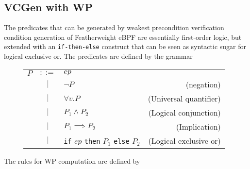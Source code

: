 \subsection{VCGen with WP}
\label{subsec:vcgen_wp}

The predicates that can be generated by weakest precondition verification condition generation of Featherweight eBPF are essentially first-order logic, but extended with an \texttt{if-then-else} construct that can be seen as syntactic sugar for logical exclusive or. The predicates are defined by the grammar
\begin{figure}[H]
  \centering
  \begin{tabular}{lclr}
    $P$ & $::=$ & $ep$ & \\
                 & $|$ & $\neg P$ & (negation) \\    
                 & $|$ & $\forall v . P$ & (Universal quantifier) \\
                 & $|$ &  $P_1 \land P_2$ & (Logical conjunction) \\
                 & $|$ &  $P_1 \implies P_2$ & (Implication) \\
                 & $|$ &  \texttt{if} $ep$ \texttt{then} $P_1$ \texttt{else}  $P_2$ & (Logical exclusive or) \\        
\end{tabular}    
\end{figure}



The rules for WP computation are defined by


